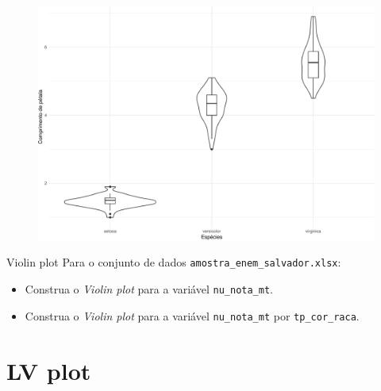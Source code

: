 \documentclass[
  10pt,
  ignorenonframetext,
]{beamer}
\providecommand{\tightlist}{%
  \setlength{\itemsep}{0pt}\setlength{\parskip}{0pt}}\usepackage{longtable,booktabs,array}
\begin{document}
\begin{frame}
\begin{figure}

{\centering \includegraphics[width=1\textwidth,height=\textheight]{exploracao-visualizacao_files/figure-beamer/unnamed-chunk-114-1.pdf}

}

\end{figure}
\end{frame}

\begin{frame}[fragile]{Violin plot}
\protect\hypertarget{violin-plot-4}{}
Para o conjunto de dados \texttt{amostra\_enem\_salvador.xlsx}:

\begin{itemize}
\tightlist
\item
  Construa o \emph{Violin plot} para a variável \texttt{nu\_nota\_mt}.
\item
  Construa o \emph{Violin plot} para a variável \texttt{nu\_nota\_mt}
  por \texttt{tp\_cor\_raca}.
\end{itemize}
\end{frame}

\hypertarget{lv-plot}{%
\section{LV plot}\label{lv-plot}}
\end{document}
